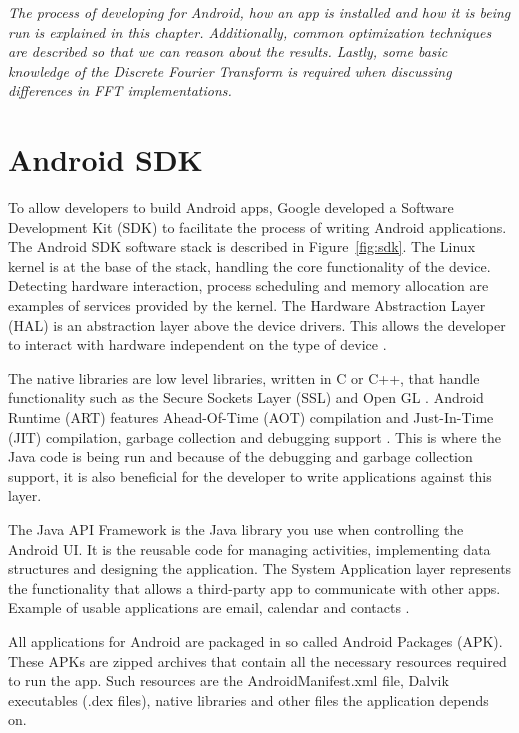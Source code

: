 \textit{The process of developing for Android, how an app is installed and how it is being run is explained in this chapter. Additionally, common optimization techniques are described so that we can reason about the results. Lastly, some basic knowledge of the Discrete Fourier Transform is required when discussing differences in FFT implementations. }

\section{Android SDK}
To allow developers to build Android apps, Google developed a Software Development Kit (SDK) to facilitate the process of writing Android applications. The Android SDK software stack is described in Figure~\ref{fig:sdk}. The Linux kernel is at the base of the stack, handling the core functionality of the device. Detecting hardware interaction, process scheduling and memory allocation are examples of services provided by the kernel. The Hardware Abstraction Layer (HAL) is an abstraction layer above the device drivers. This allows the developer to interact with hardware independent on the type of device \cite{android:hal}.

The native libraries are low level libraries, written in C or C++, that handle functionality such as the Secure Sockets Layer (SSL) and Open GL \cite{komatineni2012pro}. Android Runtime (ART) features Ahead-Of-Time (AOT) compilation and Just-In-Time (JIT) compilation, garbage collection and debugging support \cite{android:sdk:stack}. This is where the Java code is being run and because of the debugging and garbage collection support, it is also beneficial for the developer to write applications against this layer.

The Java API Framework is the Java library you use when controlling the Android UI. It is the reusable code for managing activities, implementing data structures and designing the application. The System Application layer represents the functionality that allows a third-party app to communicate with other apps. Example of usable applications are email, calendar and contacts \cite{android:sdk:stack}.

All applications for Android are packaged in so called Android Packages (APK). These APKs are zipped archives that contain all the necessary resources required to run the app. Such resources are the AndroidManifest.xml file, Dalvik executables (.dex files), native libraries and other files the application depends on.

